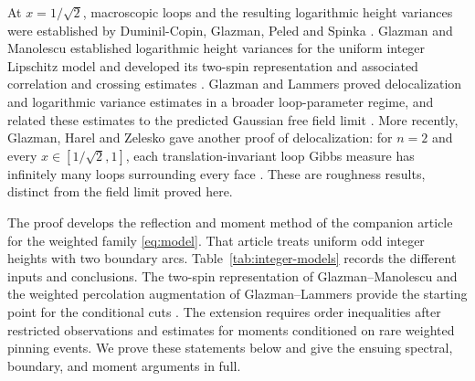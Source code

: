\documentclass[11pt]{article}
\theoremstyle{definition}
\theoremstyle{remark}
\numberwithin{equation}{section}
\begin{document}
At $x=1/\sqrt2$, macroscopic loops and the resulting logarithmic height
variances were established by Duminil-Copin, Glazman, Peled and Spinka
\cite[Theorem~1 and Section~1.2]{DGPS2021}.
Glazman and Manolescu established logarithmic height variances for the uniform
integer Lipschitz model and developed its two-spin representation and
associated correlation and crossing estimates \cite{GM2021}.
Glazman and Lammers proved delocalization and logarithmic variance
estimates in a broader loop-parameter regime, and related these estimates
to the predicted Gaussian free field limit
\cite[Section~1.2.4]{GL2025}.  More recently, Glazman, Harel and Zelesko
gave another proof of delocalization: for $n=2$ and every
$x\in[1/\sqrt2,1]$, each translation-invariant loop Gibbs measure
has infinitely many loops surrounding every face
\cite[Theorem~2]{GHZ2025}.  These are roughness results, distinct from
the field limit proved here.

The proof develops the reflection and moment method of
the companion article \cite[Sections~5, 7, 9, and 10]{UniformIntegerGFF}
for the weighted family \eqref{eq:model}.  That article treats uniform
odd integer heights with two boundary arcs.  Table~\ref{tab:integer-models}
records the different inputs and conclusions.
The two-spin representation of Glazman--Manolescu and the weighted
percolation augmentation of Glazman--Lammers provide the starting point
for the conditional cuts \cite{GM2021,GL2025}.  The extension requires
order inequalities after restricted observations and estimates for
moments conditioned on rare weighted pinning events.  We prove these
statements below and give the ensuing spectral, boundary, and moment
arguments in full.
\end{document}
